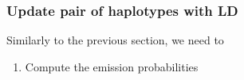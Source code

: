 \documentclass{bioinfo}
\begin{document}
\begin{enumerate}
\end{enumerate}


\subsubsection{Update pair of haplotypes with LD}\label{sec:deconvolute}
Similarly to the previous section, we need to
\begin{enumerate}
\item Compute the emission probabilities


\end{enumerate}
\end{document}
